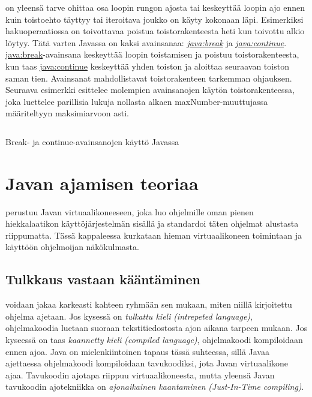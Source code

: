 \documentclass{tufte-book}
\newcommand{\eng}[1]{\textit{(#1)}}
\newcommand{\new}[1]{\textit{\gls{#1}}}
\newcommand{\neweng}[2]{\new{#1} \eng{#2}}
\newcommand{\java}[1]{\underline{\gls{java:#1}}}
\newcommand{\newjava}[1]{\textit{\java{#1}}}
\newcommand{\code}[3]{
\begin{listing}
    \inputminted{java}{OhjelmointiopasEsimerkit/src/#1/#2.java}
    \caption{#3}
    \label{Java-#1-#2}
\end{listing}
}
\begin{document}
 on yleensä tarve ohittaa osa loopin rungon ajosta tai keskeyttää
loopin ajo ennen kuin toistoehto täyttyy tai iteroitava joukko on käyty kokonaan läpi. Esimerkiksi
hakuoperaatiossa on toivottavaa poistua toistorakenteesta heti kun toivottu alkio löytyy. Tätä
varten Javassa on kaksi avainsanaa: \newjava{break} ja \newjava{continue}. \java{break}-avainsana
keskeyttää loopin toistamisen ja poistuu toistorakenteesta, kun taas \java{continue} keskeyttää
yhden toiston ja aloittaa seuraavan toiston saman tien. Avainsanat mahdollistavat toistorakenteen
tarkemman ohjauksen. Seuraava esimerkki esittelee molempien avainsanojen käytön toistorakenteessa,
joka luettelee parillisia lukuja nollasta alkaen maxNumber-muuttujassa määriteltyyn
maksimiarvoon asti.

\code{week3}{BasicBreakContinue}{Break- ja continue-avainsanojen käyttö Javassa}


\section{Javan ajamisen teoriaa}
\label{virtuaalikoneesta}

 perustuu Javan virtuaalikoneeseen, joka luo ohjelmille oman pienen
hiekkalaatikon käyttöjärjestelmän sisällä ja standardoi täten ohjelmat alustasta riippumatta.
Tässä kappaleessa kurkataan hieman virtuaalikoneen toimintaan ja käyttöön ohjelmoijan
näkökulmasta.

\subsection{Tulkkaus vastaan kääntäminen}
\label{JIT}

 voidaan jakaa karkeasti kahteen ryhmään sen mukaan, miten niillä
kirjoitettu ohjelma ajetaan. Jos kysessä on \neweng{tulkattu kieli}{intrepeted language},
ohjelmakoodia luetaan suoraan tekstitiedostosta ajon aikana tarpeen mukaan. Jos kyseessä on taas
\neweng{kaannetty kieli}{compiled language}, ohjelmakoodi kompiloidaan ennen ajoa. Java on
mielenkiintoinen tapaus tässä suhteessa, sillä Javaa ajettaessa ohjelmakoodi kompiloidaan
tavukoodiksi, jota Javan virtuaalikone ajaa. Tavukoodin ajotapa riippuu virtuaalikoneesta, mutta
yleensä Javan tavukoodin ajotekniikka on
\neweng{ajonaikainen kaantaminen}{Just-In-Time compiling}.
\end{document}
